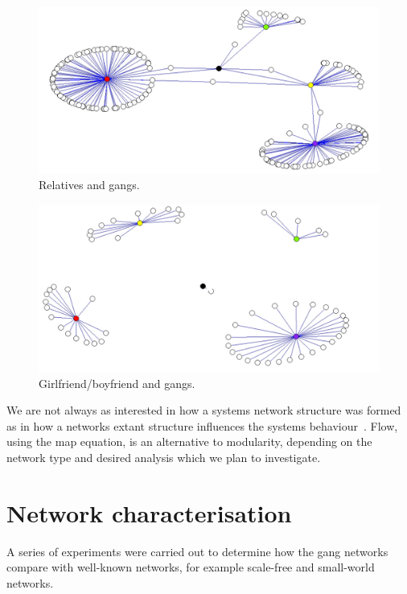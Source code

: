 \documentclass[twocolumn]{svjour3}          %
\theoremstyle{definition}
\begin{document}
\begin{figure}[!ht]
\centering
\includegraphics[width=\columnwidth]{images/realrelatives.pdf}
\caption{Relatives and gangs.}
\label{fig:realrelatives} 
\end{figure}

\begin{figure}[!ht]
\centering
\includegraphics[width=\columnwidth]{images/girlfriends.pdf}
\caption{Girlfriend/boyfriend and gangs.}
\label{fig:girlfriends} 
\end{figure}

We are not always as interested in how a systems network structure was
formed as in how a networks extant structure influences the systems
behaviour~\citep{rosvall-et-al:2010}. Flow, using the map equation, is
an alternative to modularity, depending on the network type and
desired analysis which we plan to investigate.


\section{Network characterisation}\label{sec:networkcharacteristics}

A series of experiments were carried out to determine how the gang
networks compare with well-known networks, for example scale-free and
small-world networks.
\end{document}
